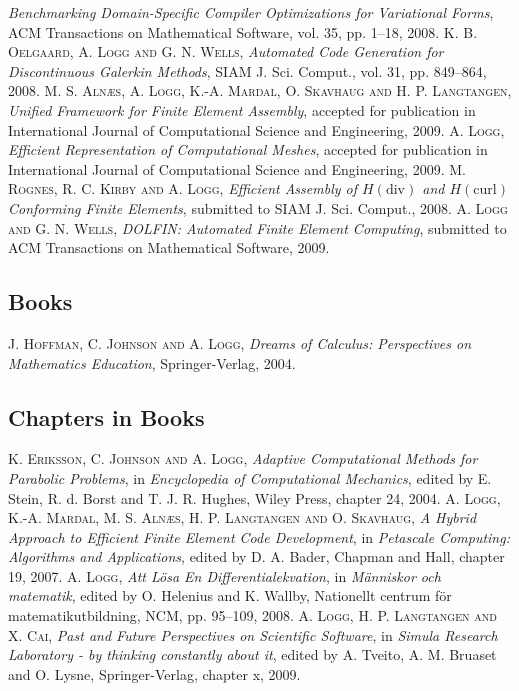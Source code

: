 \begin{thebibliography}{99}
{\textit{Benchmarking Domain-Specific Compiler Optimizations for Variational Forms},
ACM Transactions on Mathematical Software,
vol. 35,
pp. 1--18,
2008.
}
 {\textsc{K. B. Oelgaard, A. Logg and G. N. Wells},
\textit{Automated Code Generation for Discontinuous Galerkin Methods},
SIAM J. Sci. Comput.,
vol. 31,
pp. 849--864,
2008.
}
 {\textsc{M. S. Aln{\ae}s, A. Logg, K.-A. Mardal, O. Skavhaug and H. P. Langtangen},
\textit{Unified Framework for Finite Element Assembly},
accepted for publication in International Journal of Computational Science and Engineering,
2009.
}
 {\textsc{A. Logg},
\textit{Efficient Representation of Computational Meshes},
accepted for publication in International Journal of Computational Science and Engineering,
2009.
}
 {\textsc{M. Rognes, R. C. Kirby and A. Logg},
\textit{Efficient Assembly of $H(\mathrm{div})$ and $H(\mathrm{curl})$ Conforming Finite Elements},
submitted to SIAM J. Sci. Comput.,
2008.
}
 {\textsc{A. Logg and G. N. Wells},
\textit{DOLFIN: Automated Finite Element Computing},
submitted to ACM Transactions on Mathematical Software,
2009.
}
\subsection*{Books}
 {\textsc{J. Hoffman, C. Johnson and A. Logg},
\textit{Dreams of Calculus: Perspectives on Mathematics Education},
Springer-Verlag,
2004.
}
\subsection*{Chapters in Books}
 {\textsc{K. Eriksson, C. Johnson and A. Logg},
\textit{Adaptive Computational Methods for Parabolic Problems},
in \textit{Encyclopedia of Computational Mechanics},
edited by E. Stein, R. d. Borst and T. J. R. Hughes,
Wiley Press,
chapter 24,
2004.
}
 {\textsc{A. Logg, K.-A. Mardal, M. S. Aln{\ae}s, H. P. Langtangen and O. Skavhaug},
\textit{A Hybrid Approach to Efficient Finite Element Code Development},
in \textit{Petascale Computing: Algorithms and Applications},
edited by D. A. Bader,
Chapman and Hall,
chapter 19,
2007.
}
 {\textsc{A. Logg},
\textit{Att L\"osa En Differentialekvation},
in \textit{M\"anniskor och matematik},
edited by O. Helenius and K. Wallby,
Nationellt centrum f{\"o}r matematikutbildning, NCM,
pp. 95--109,
2008.
}
 {\textsc{A. Logg, H. P. Langtangen and X. Cai},
\textit{Past and Future Perspectives on Scientific Software},
in \textit{Simula Research Laboratory - by thinking constantly about it},
edited by A. Tveito, A. M. Bruaset and O. Lysne,
Springer-Verlag,
chapter x,
2009.
}

\end{thebibliography}

